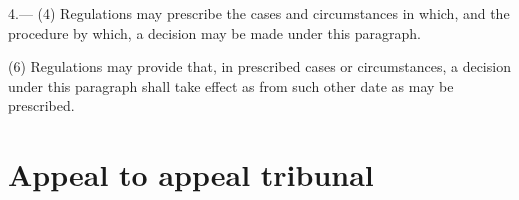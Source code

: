 \documentclass[12pt,a4paper]{article}
\begin{document}
4.---%
%
%
%
%
(4) Regulations may prescribe the cases and circumstances in which, and the procedure by which, a decision may be made under this paragraph.


(6) Regulations may provide that, in prescribed cases or circumstances, a decision under this paragraph shall take effect as from such other date as may be prescribed.


%

\section*{Appeal to appeal tribunal}
\end{document}
